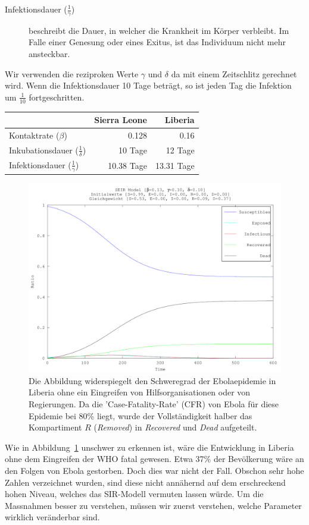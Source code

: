 \begin{refsection}
\begin{description}
  \item [Infektionsdauer ($\frac{1}{\gamma}$)] beschreibt die Dauer, in welcher die Krankheit im Körper verbleibt. Im Falle einer Genesung oder eines Exitus, ist das Individuum nicht mehr ansteckbar. 
\end{description}
Wir verwenden die reziproken Werte $\gamma$ und $\delta$ da mit einem Zeitschlitz gerechnet wird. Wenn die Infektionsdauer 10 Tage beträgt, so ist jeden Tag die Infektion um $\frac{1}{10}$ fortgeschritten.
\begin{table}[h]
\centering
\begin{tabular}{ l r r }
						& Sierra Leone & Liberia \\
						\hline
  Kontaktrate ($\beta$) & 0.128 & 0.16 \\
  Inkubationsdauer ($\frac{1}{\delta}$) & 10 Tage & 12 Tage \\
  Infektionsdauer ($\frac{1}{\gamma}$) & 10.38 Tage & 13.31 Tage \\
\end{tabular}
\end{table}
\begin{figure}[ht]
	\centering
	\includegraphics[width=.8\textwidth]{sir/images/ebola_outbreak}
  \caption[Ebola Ausbruch]{Die Abbildung widerspiegelt den Schweregrad der Ebolaepidemie in Liberia ohne ein Eingreifen von Hilfsorganisationen oder von Regierungen. Da die 'Case-Fatality-Rate' (CFR) von Ebola für diese Epidemie bei 80\% liegt\cite{sir:estimating_fatality}, wurde der Vollständigkeit halber das Kompartiment $R$ (\emph{Removed}) in \emph{Recovered} und \emph{Dead} aufgeteilt.}
  \label{fig:ebola_outbreak}
\end{figure}

Wie in Abbildung~\ref{fig:ebola_outbreak} unschwer zu erkennen ist, wäre die Entwicklung in Liberia ohne dem Eingreifen der WHO fatal gewesen. Etwa 37\% der Bevölkerung wäre an den Folgen von Ebola gestorben. Doch dies war nicht der Fall. Obschon sehr hohe Zahlen verzeichnet wurden, sind diese nicht annähernd auf dem erschreckend hohen Niveau, welches das SIR-Modell vermuten lassen würde. Um die Massnahmen besser zu verstehen, müssen wir zuerst verstehen, welche Parameter wirklich veränderbar sind.


\end{refsection}

